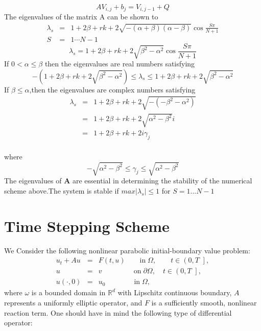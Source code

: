 \documentclass[12pt]{article}
\numberwithin{equation}{section} %
\begin{document}
 \begin{equation*}
 AV_{i,j} + b_{j}=V_{i,j-1}+Q
 \end{equation*}
The eigenvalues of the matrix A can be shown to
%
%
\begin{equation*}
\begin{array}{lcl} \lambda_{s} & = &1+2\beta+rk+2\sqrt{-(\alpha+\beta)(\alpha-\beta)}\cos\frac{S\pi}{N+1}  \\ S & = & 1\cdots N-1 \end{array}
\end{equation*}
\begin{equation*}
\lambda_s=1+2\beta+rk+2\sqrt{\beta^2-\alpha^2}\cos\frac{S\pi}{N+1}
\end{equation*}
If $0<\alpha \leq \beta$ then the eigenvalues are real numbers
satisfying
\begin{equation*}
-(1+2\beta+rk+2\sqrt{\beta^2-\alpha^2})\leq \lambda_s \leq
1+2\beta+rk+2\sqrt{\beta^2-\alpha^2}
\end{equation*}
If $\beta \leq \alpha$,then the eigenvalues are complex numbers
satisfying
\begin{equation*}
\begin{array}{cccllllc}

\lambda_s&=&1+2\beta+rk+2\sqrt{-(-\beta^2-\alpha^2)}\\
&=&1+2\beta+rk+2\sqrt{\alpha^2-\beta^2}i\\
&=&1+2\beta+rk+2i\gamma_j\\
\end{array}
\end{equation*}

where
\begin{equation*}
-\sqrt{\alpha^2-\beta^2}\leq \gamma_j\leq\sqrt{\alpha^2-\beta^2}
\end{equation*}
The eigenvalues of \textbf{A} are essential in determining the
stability of the numerical scheme above.The system is stable if
$max|\lambda_s | \leq 1$ for $S=1...N-1$
\section{Time Stepping Scheme}
We Consider the following nonlinear parabolic initial-boundary value
problem:
\begin{eqnarray}
u_t + A u &=& F(t,u) \qquad \textrm {in} \; \Omega,\qquad t \in \left( 0,T \,\, \right], \label{Eq1}\\
u &=& v \qquad \qquad \; \, \textrm {on} \;\partial \Omega,\quad t \in \left( 0,T \,\, \right], \nonumber \\
u(\cdot,0) &=& u_0 \qquad \qquad \textrm {in} \;\Omega, \nonumber
\end{eqnarray}
where $\omega$ is a bounded domain in $\mathbb{R}^{d}$ with
Lipschitz continuous boundary, $A$ represents a uniformly elliptic
operator, and $F$ is a sufficiently smooth, nonlinear reaction term.
One should have in mind the following type of  differential
operator:
\end{document}
